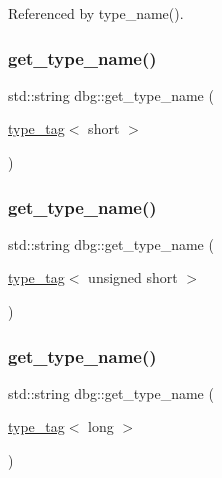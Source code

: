 Referenced by type\+\_\+name().

\mbox{\label{namespacedbg_a77b693006b8b158eb9a4604fba56a782}} 
\subsubsection{\texorpdfstring{get\+\_\+type\+\_\+name()}{get\_type\_name()}\hspace{0.1cm}{\footnotesize\ttfamily [2/10]}}
{\footnotesize\ttfamily std\+::string dbg\+::get\+\_\+type\+\_\+name (\begin{DoxyParamCaption}\item[{\hyperlink{structdbg_1_1type__tag}{type\+\_\+tag}$<$ short $>$}]{ }\end{DoxyParamCaption})\hspace{0.3cm}{\ttfamily [inline]}}

\mbox{\label{namespacedbg_ae70efee8c9a9d398975f71b216602097}} 
\subsubsection{\texorpdfstring{get\+\_\+type\+\_\+name()}{get\_type\_name()}\hspace{0.1cm}{\footnotesize\ttfamily [3/10]}}
{\footnotesize\ttfamily std\+::string dbg\+::get\+\_\+type\+\_\+name (\begin{DoxyParamCaption}\item[{\hyperlink{structdbg_1_1type__tag}{type\+\_\+tag}$<$ unsigned short $>$}]{ }\end{DoxyParamCaption})\hspace{0.3cm}{\ttfamily [inline]}}

\mbox{\label{namespacedbg_a380f1bf409dda5e8c67a269b27d14aee}} 
\subsubsection{\texorpdfstring{get\+\_\+type\+\_\+name()}{get\_type\_name()}\hspace{0.1cm}{\footnotesize\ttfamily [4/10]}}
{\footnotesize\ttfamily std\+::string dbg\+::get\+\_\+type\+\_\+name (\begin{DoxyParamCaption}\item[{\hyperlink{structdbg_1_1type__tag}{type\+\_\+tag}$<$ long $>$}]{ }\end{DoxyParamCaption})\hspace{0.3cm}{\ttfamily [inline]}}

